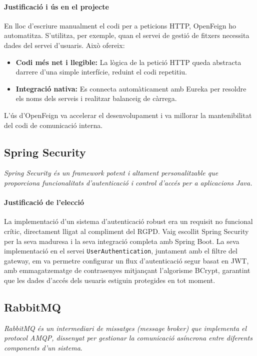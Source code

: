 \paragraph{Justificació i ús en el projecte}
En lloc d'escriure manualment el codi per a peticions HTTP, OpenFeign ho automatitza. S'utilitza, per exemple, quan el servei de gestió de fitxers necessita dades del servei d'usuaris. Això ofereix:
\begin{itemize}
    \item \textbf{Codi més net i llegible:} La lògica de la petició HTTP queda abstracta darrere d'una simple interfície, reduint el codi repetitiu.
    \item \textbf{Integració nativa:} Es connecta automàticament amb Eureka per resoldre els noms dels serveis i realitzar balanceig de càrrega.
\end{itemize}
L'ús d'OpenFeign va accelerar el desenvolupament i va millorar la mantenibilitat del codi de comunicació interna.

\subsection{Spring Security}
\textit{Spring Security és un framework potent i altament personalitzable que proporciona funcionalitats d'autenticació i control d'accés per a aplicacions Java.}

\paragraph{Justificació de l'elecció}
La implementació d'un sistema d'autenticació robust era un requisit no funcional crític, directament lligat al compliment del RGPD. Vaig escollit Spring Security per la seva maduresa i la seva integració completa amb Spring Boot. La seva implementació en el servei \texttt{UserAuthentication}, juntament amb el filtre del gateway, em va permetre configurar un flux d'autenticació segur basat en JWT, amb emmagatzematge de contrasenyes mitjançant l'algorisme BCrypt, garantint que les dades d'accés dels usuaris estiguin protegides en tot moment.

\subsection{RabbitMQ}
\textit{RabbitMQ és un intermediari de missatges (message broker) que implementa el protocol AMQP, dissenyat per gestionar la comunicació asíncrona entre diferents components d'un sistema}.


